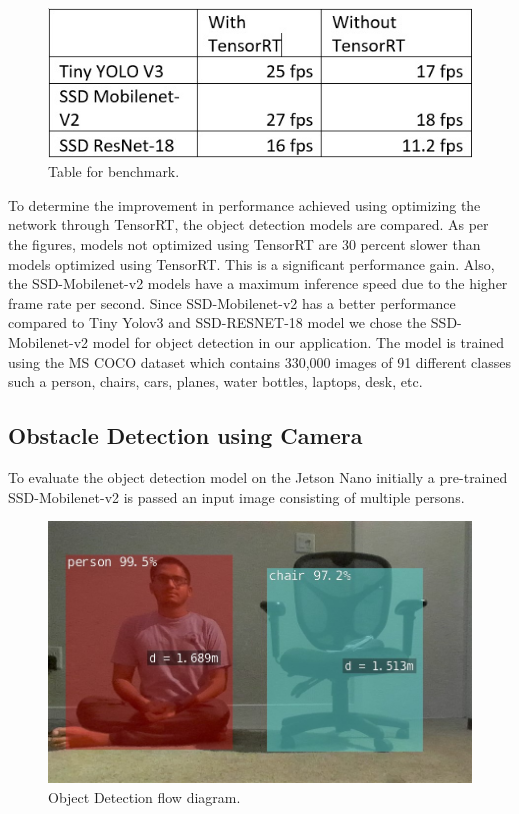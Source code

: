 \documentclass{IEEEtran}
\newcommand{\figwidthb}{0.80\linewidth}
\begin{document}
\begin{figure}[htb]
\centering
\includegraphics[width=\figwidthb]{fig/Table.jpg}
\caption{Table for benchmark.} \label{fig.structure}
\end{figure}

To determine the improvement in performance achieved using optimizing the network through TensorRT, the object detection models are compared. As per the figures, models not optimized using TensorRT are 30 percent slower than models optimized using TensorRT. This is a significant performance gain. Also, the SSD-Mobilenet-v2 models have a maximum inference speed due to the higher frame rate per second. Since SSD-Mobilenet-v2 has a better performance compared to Tiny Yolov3 and SSD-RESNET-18 model we chose the SSD-Mobilenet-v2 model for object detection in our application. The model is trained using the MS COCO dataset which contains 330,000 images of 91 different classes such a person, chairs, cars, planes, water bottles, laptops, desk, etc.

\subsection{Obstacle Detection using Camera}
To evaluate the object detection model on the Jetson Nano initially a pre-trained SSD-Mobilenet-v2 is passed an input image consisting of multiple persons.

\begin{figure}[htb]
\centering
\includegraphics[width=\figwidthb]{fig/obj_detect_saumil.jpg}
\caption{Object Detection flow diagram.} \label{fig.structure}
\end{figure}
\end{document}
